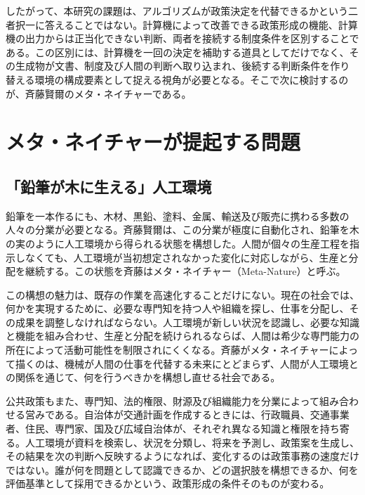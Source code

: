 したがって、本研究の課題は、アルゴリズムが政策決定を代替できるかという二者択一に答えることではない。計算機によって改善できる政策形成の機能、計算機の出力からは正当化できない判断、両者を接続する制度条件を区別することである。この区別には、計算機を一回の決定を補助する道具としてだけでなく、その生成物が文書、制度及び人間の判断へ取り込まれ、後続する判断条件を作り替える環境の構成要素として捉える視角が必要となる。そこで次に検討するのが、斉藤賢爾のメタ・ネイチャーである。

\section{メタ・ネイチャーが提起する問題}
\label{sec:intro_metanature_problem}

\subsection{「鉛筆が木に生える」人工環境}
\label{subsec:intro_pencil_tree}

鉛筆を一本作るにも、木材、黒鉛、塗料、金属、輸送及び販売に携わる多数の人々の分業が必要となる。斉藤賢爾は、この分業が極度に自動化され、鉛筆を木の実のように人工環境から得られる状態を構想した。人間が個々の生産工程を指示しなくても、人工環境が当初想定されなかった変化に対応しながら、生産と分配を継続する。この状態を斉藤はメタ・ネイチャー（Meta-Nature）と呼ぶ\cite[pp. 361--363]{saito2025metanature}。

この構想の魅力は、既存の作業を高速化することだけにない。現在の社会では、何かを実現するために、必要な専門知を持つ人や組織を探し、仕事を分配し、その成果を調整しなければならない。人工環境が新しい状況を認識し、必要な知識と機能を組み合わせ、生産と分配を続けられるならば、人間は希少な専門能力の所在によって活動可能性を制限されにくくなる。斉藤がメタ・ネイチャーによって描くのは、機械が人間の仕事を代替する未来にとどまらず、人間が人工環境との関係を通じて、何を行うべきかを構想し直せる社会である\cite[pp. 363--370]{saito2025metanature}。

公共政策もまた、専門知、法的権限、財源及び組織能力を分業によって組み合わせる営みである。自治体が交通計画を作成するときには、行政職員、交通事業者、住民、専門家、国及び広域自治体が、それぞれ異なる知識と権限を持ち寄る。人工環境が資料を検索し、状況を分類し、将来を予測し、政策案を生成し、その結果を次の判断へ反映するようになれば、変化するのは政策事務の速度だけではない。誰が何を問題として認識できるか、どの選択肢を構想できるか、何を評価基準として採用できるかという、政策形成の条件そのものが変わる。

